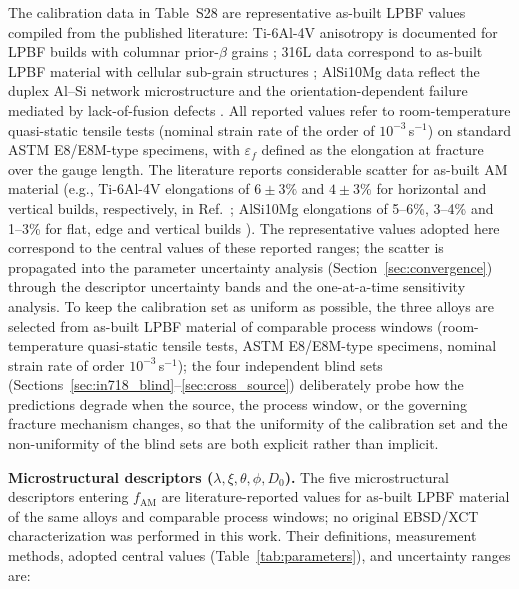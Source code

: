 The calibration data in Table~S28 are representative as-built LPBF values compiled from the published literature: Ti-6Al-4V anisotropy is documented for LPBF builds with columnar prior-$\beta$ grains \cite{carroll2015anisotropic,wang2024metals_ti64}; 316L data correspond to as-built LPBF material with cellular sub-grain structures \cite{jaskari2021materials_316l}; AlSi10Mg data reflect the duplex Al--Si network microstructure and the orientation-dependent failure mediated by lack-of-fusion defects \cite{wu2023sci_alsi}. All reported values refer to room-temperature quasi-static tensile tests (nominal strain rate of the order of $10^{-3}$\,s$^{-1}$) on standard ASTM E8/E8M-type specimens, with $\varepsilon_f$ defined as the elongation at fracture over the gauge length. The literature reports considerable scatter for as-built AM material (e.g., Ti-6Al-4V elongations of $6\pm3\%$ and $4\pm3\%$ for horizontal and vertical builds, respectively, in Ref.~\cite{wang2024metals_ti64}; AlSi10Mg elongations of 5--6\%, 3--4\% and 1--3\% for flat, edge and vertical builds \cite{wu2023sci_alsi}). The representative values adopted here correspond to the central values of these reported ranges; the scatter is propagated into the parameter uncertainty analysis (Section~\ref{sec:convergence}) through the descriptor uncertainty bands and the one-at-a-time sensitivity analysis. To keep the calibration set as uniform as possible, the three alloys are selected from as-built LPBF material of comparable process windows (room-temperature quasi-static tensile tests, ASTM E8/E8M-type specimens, nominal strain rate of order $10^{-3}$\,s$^{-1}$); the four independent blind sets (Sections~\ref{sec:in718_blind}--\ref{sec:cross_source}) deliberately probe how the predictions degrade when the source, the process window, or the governing fracture mechanism changes, so that the uniformity of the calibration set and the non-uniformity of the blind sets are both explicit rather than implicit.

\textbf{Microstructural descriptors ($\lambda, \xi, \theta, \phi, D_0$).} The five microstructural descriptors entering $f_{\mathrm{AM}}$ are literature-reported values for as-built LPBF material of the same alloys and comparable process windows; no original EBSD/XCT characterization was performed in this work. Their definitions, measurement methods, adopted central values (Table~\ref{tab:parameters}), and uncertainty ranges are:


